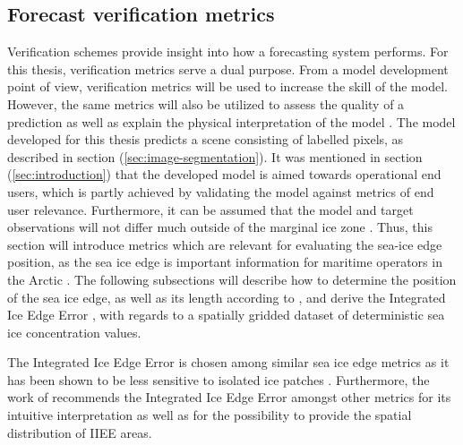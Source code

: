 \documentclass[../main/thesis.tex]{subfiles}
\begin{document}
\subsection{Forecast verification metrics}
Verification schemes provide insight into how a forecasting system performs. For this thesis, verification metrics serve a dual purpose. From a model development point of view, verification metrics will be used to increase the skill of the model. However, the same metrics will also be utilized to assess the quality of a prediction as well as explain the physical interpretation of the model \citep{Casati2008}. The model developed for this thesis predicts a scene consisting of labelled pixels, as described in section (\ref{sec:image-segmentation}). It was mentioned in section (\ref{sec:introduction}) that the developed model is aimed towards operational end users, which is partly achieved by validating the model against metrics of end user relevance. Furthermore, it can be assumed that the model and target observations will not differ much outside of the marginal ice zone \citep{Fritzner2020}. Thus, this section will introduce metrics which are relevant for evaluating the sea-ice edge position, as the sea ice edge is important information for maritime operators in the Arctic \citep{Melsom2019}. The following subsections will describe how to determine the position of the sea ice edge, as well as its length according to \citet{Melsom2019}, and derive the Integrated Ice Edge Error \citep{Goessling2016}, with regards to a spatially gridded dataset of deterministic sea ice concentration values.

The Integrated Ice Edge Error is chosen among similar sea ice edge metrics \citep{Melsom2019, Dukhovskoy2015} as it has been shown to be less sensitive to isolated ice patches \citep{Palerme2019}. Furthermore, the work of \citet{Melsom2019} recommends the Integrated Ice Edge Error amongst other metrics for its intuitive interpretation as well as for the possibility to provide the spatial distribution of IIEE areas.

\end{document}
